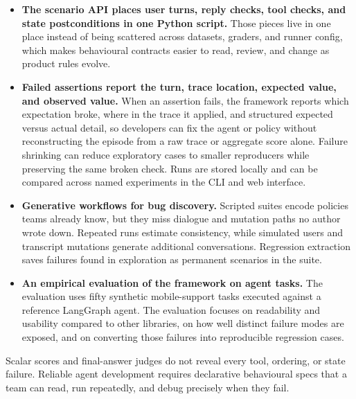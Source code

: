 \begin{itemize}
    \item \textbf{The scenario API places user turns, reply checks, tool checks, and state postconditions in one Python script.} Those pieces live in one place instead of being scattered across datasets, graders, and runner config, which makes behavioural contracts easier to read, review, and change as product rules evolve.

    \item \textbf{Failed assertions report the turn, trace location, expected value, and observed value.} When an assertion fails, the framework reports which expectation broke, where in the trace it applied, and structured expected versus actual detail, so developers can fix the agent or policy without reconstructing the episode from a raw trace or aggregate score alone. Failure shrinking can reduce exploratory cases to smaller reproducers while preserving the same broken check. Runs are stored locally and can be compared across named experiments in the CLI and web interface.

    \item \textbf{Generative workflows for bug discovery.} Scripted suites encode policies teams already know, but they miss dialogue and mutation paths no author wrote down. Repeated runs estimate consistency, while simulated users and transcript mutations generate additional conversations. Regression extraction saves failures found in exploration as permanent scenarios in the suite.

    \item \textbf{An empirical evaluation of the framework on agent tasks.} The evaluation uses fifty synthetic mobile-support tasks executed against a reference LangGraph agent. The evaluation focuses on readability and usability compared to other libraries, on how well distinct failure modes are exposed, and on converting those failures into reproducible regression cases.
\end{itemize}

Scalar scores and final-answer judges do not reveal every tool, ordering, or state failure. Reliable agent development requires declarative behavioural specs that a team can read, run repeatedly, and debug precisely when they fail.
